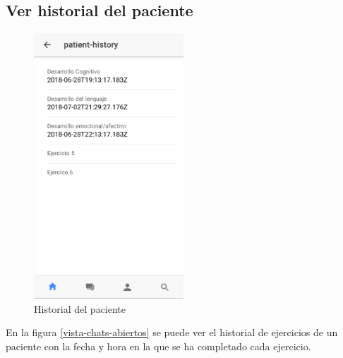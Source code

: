 \subsection{Ver historial del paciente}
\begin{figure}[!h]
    \centering
    \includegraphics[width=0.5\textwidth]{images/screenshots/doctor-view-history.png}
    \caption{Historial del paciente}
    \label{doctor-view-history}
\end{figure}

En la figura \ref{vista-chats-abiertos} se puede ver el historial de ejercicios de un
paciente con la fecha y hora en la que se ha completado cada ejercicio.
\clearpage

